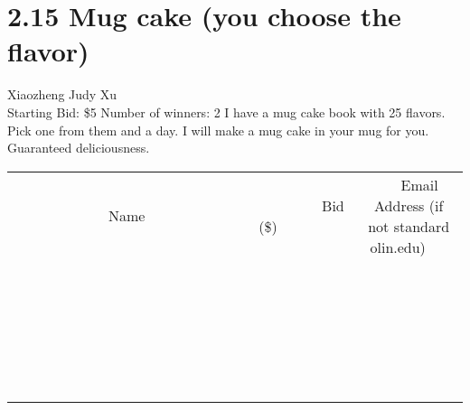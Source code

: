 \documentclass[11pt]{article}
\begin{document}
\section*{2.15 Mug cake (you choose the flavor)}
Xiaozheng Judy Xu
\\
Starting Bid: \$5
\newline
Number of winners: 2
\newline
I have a mug cake book with 25 flavors. Pick one from them and a day. I will make a mug cake in your mug for you. Guaranteed deliciousness.
\\[6ex]
\begin{tabular}{c c c}
~~~~~~~~~~~~~Name~~~~~~~~~~~~~ & ~~~~~~~~~Bid (\$)~~~~~~~~~  & ~~~Email Address (if not standard olin.edu)~~~\\
 & & \\
\hline
 & & \\
\hline
 & & \\
\hline
 & & \\
\hline
 & & \\
\hline
 & & \\
\hline
 & & \\
\hline
 & & \\
\hline
 & & \\
\hline
 & & \\
\hline
 & & \\
\hline
 & & \\
\hline
 & & \\
\hline
 & & \\
\hline
 & & \\
\hline
 & & \\
\hline
 & & \\
\hline
 & & \\
\hline
 & & \\
\hline
 & & \\
\hline
 & & \\
\hline
 & & \\
\hline
 & & \\
\hline
 & & \\
\hline
 & & \\
\hline
 & & \\
\hline
\end{tabular}
\newpage
\end{document}
